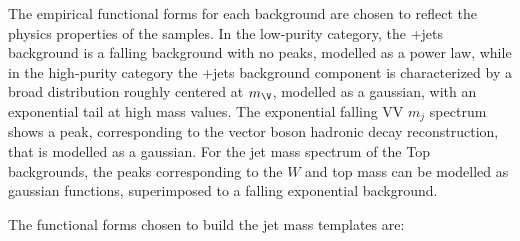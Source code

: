 The empirical functional forms for each background are chosen to reflect the physics properties of the samples. In the low-purity category, the \V+jets background is a falling background with no peaks, modelled as a power law, while in the high-purity category the \V+jets background component is characterized by a broad distribution roughly centered at $m_\V$, modelled as a gaussian, with an exponential tail at high mass values. The exponential falling VV $m_j$ spectrum shows a peak, corresponding to the vector boson hadronic decay reconstruction, that is modelled as a gaussian. For the jet mass spectrum of the Top backgrounds, the peaks corresponding to the $W$ and top mass can be modelled as gaussian functions, superimposed to a falling exponential background.


The functional forms chosen to build the jet mass templates are:

